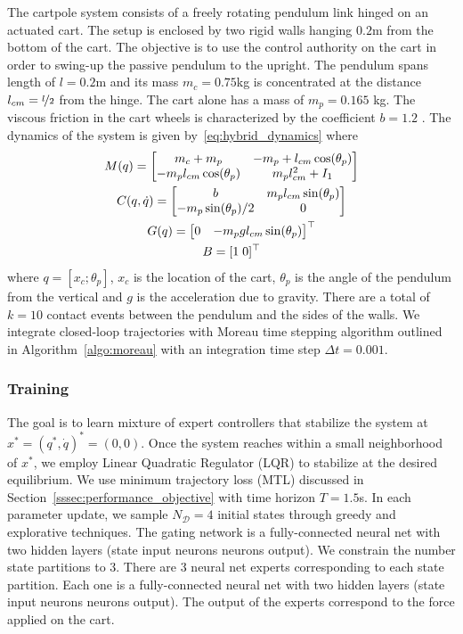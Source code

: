 The cartpole system consists of a freely rotating pendulum link hinged on an
actuated cart.
%
The setup is enclosed by two rigid walls hanging $0.2$m from the bottom of the
cart.
%
The objective is to use the control authority on the cart in order to swing-up
the passive pendulum to the upright.
%
The pendulum spans length of $l=0.2$m and its mass $m_c = 0.75$kg is
concentrated at the distance $l_{cm}=\nicefrac{l}{2}$ from the hinge.
%
The cart alone has a mass of $m_p=0.165$ kg. The viscous friction in the cart
wheels is characterized by the coefficient $b=1.2$ .
%
The dynamics of the system
is given by~\eqref{eq:hybrid_dynamics} where 
\begin{equation}
    \begin{gathered}
        M(q) = \begin{bmatrix}m_c + m_p & -m_p+l_{cm} \cos(\theta_p) \\
        -m_pl_{cm}\cos(\theta_p) & m_p l_{cm}^2+I_1\end{bmatrix} \\
        C(q, \dot{q}) = \begin{bmatrix}b  & m_pl_{cm}\sin(\theta_p) \\
                -m_p\sin(\theta_p)/2 & 0\end{bmatrix} \\
        G(q) = \begin{bmatrix}0 & -m_pg l_{cm} \sin(\theta_p)\end{bmatrix}^\top \\
        B = [1 \; 0]^\top
    \end{gathered}
\end{equation}
\noindent where $q = [x_c; \theta_p]$, $x_c$ is the location of the cart, $\theta_p$
is the angle of the pendulum from the vertical and $g$ is the acceleration due
to gravity. 
%
There are a total of $k=10$ contact events between the pendulum and the sides of
the walls.
%
We integrate closed-loop trajectories with Moreau time stepping algorithm
outlined in Algorithm~\eqref{algo:moreau} with an integration time step $\Delta
t=0.001$.
%

\subsubsection{Training}
\label{sssec:cartpole_training}

The goal is to learn mixture of expert controllers that stabilize the system at
$x^* = (q^*, \dot{q})^* = (0, 0)$.
%
Once the system reaches within a small neighborhood of $x^*$, we employ Linear
Quadratic Regulator (LQR) to stabilize at the desired equilibrium.
%
We use minimum trajectory loss (MTL) discussed in
Section~\ref{sssec:performance_objective} with time horizon $T=1.5$s.
%
In each parameter update, we sample $N_{\mathcal{D}}=4$ initial states through
greedy and explorative techniques.
%
The gating network is a fully-connected neural net with two hidden layers (state input
 neurons  neurons  output).
% 
We constrain the number state partitions to 3.
%
There are 3 neural net experts corresponding to each state partition.
%
Each one is a fully-connected neural net with two hidden layers (state input
 neurons  neurons  output).
%
The output of the experts correspond to the force applied on the cart.



